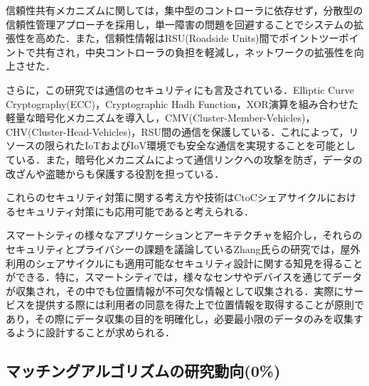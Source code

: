           \par 信頼性共有メカニズムに関しては，集中型のコントローラに依存せず，分散型の信頼性管理アプローチを採用し，単一障害の問題を回避することでシステムの拡張性を高めた．また，信頼性情報はRSU(Roadside Units)間でポイントツーポイントで共有され，中央コントローラの負担を軽減し，ネットワークの拡張性を向上させた．
          \par さらに，この研究では通信のセキュリティにも言及されている．Elliptic Curve Cryptography(ECC)，Cryptographic Hadh Function，XOR演算を組み合わせた軽量な暗号化メカニズムを導入し，CMV(Cluster-Member-Vehicles)，CHV(Cluster-Head-Vehicles)，RSU間の通信を保護している．これによって，リソースの限られたIoTおよびIoV環境でも安全な通信を実現することを可能としている．また，暗号化メカニズムによって通信リンクへの攻撃を防ぎ，データの改ざんや盗聴からも保護する役割を担っている．
          \par これらのセキュリティ対策に関する考え方や技術はCtoCシェアサイクルにおけるセキュリティ対策にも応用可能であると考えられる．
          \par スマートシティの様々なアプリケーションとアーキテクチャを紹介し，それらのセキュリティとプライバシーの課題を議論しているZhang氏らの研究では，屋外利用のシェアサイクルにも適用可能なセキュリティ設計に関する知見を得ることができる．特に，スマートシティでは，様々なセンサやデバイスを通じてデータが収集され，その中でも位置情報が不可欠な情報として収集される．実際にサービスを提供する際には利用者の同意を得た上で位置情報を取得することが原則であり，その際にデータ収集の目的を明確化し，必要最小限のデータのみを収集するように設計することが求められる．
          
  
  \subsection{マッチングアルゴリズムの研究動向(0\%)}
    \label{sec:マッチングアルゴリズムの研究動向}
      \par 

